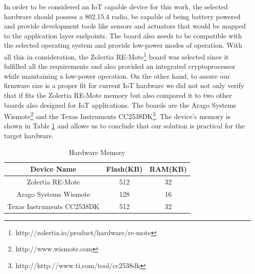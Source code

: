 \documentclass{llncs}
\begin{document}

In order to be considered an \ac{IoT} capable device for this work, the selected hardware should possess a 802.15.4 radio, be capable of being battery powered and provide development tools like sensors and actuators that would be mapped to the application layer endpoints. 
The board also needs to be compatible with the selected operating system and provide low-power modes of operation. 
With all this in consideration, the Zolertia RE-Mote\footnote{http://zolertia.io/product/hardware/re-mote} board was selected since it fulfilled all the requirements and also provided an integrated cryptoprocessor while maintaining a low-power operation.
On the other hand, to assure our firmware size is a proper fit for current \ac{IoT} hardware we did not not only verify that if fits the Zolertia RE-Mote memory but also compared it to two other boards also designed for \ac{IoT} applications. 
The boards are the Arago Systems Wismote\footnote{http://www.wismote.com} and the Texas Instruments CC2538DK\footnote{http://http://www.ti.com/tool/cc2538dk}. 
The device's memory is shown in Table \ref{tab:hardware_memory} and allows us to conclude that our solution is practical for the target hardware.

\begin{table}
\centering
\caption{Hardware Memory}
\label{tab:hardware_memory}
\begin{tabular}{|c|c|c|} \hline
Device Name&Flash(KB)&RAM(KB)\\ \hline
Zolertia RE-Mote& 512& 32\\ \hline
Arago Systems Wismote& 128& 16\\ \hline
Texas Instruments CC2538DK& 512 & 32\\
\hline\end{tabular}
\end{table}
\end{document}
